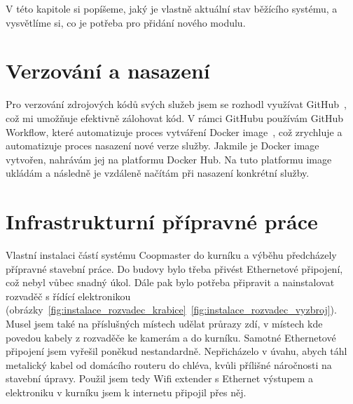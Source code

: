 V této kapitole si popíšeme, jaký je vlastně aktuální stav běžícího systému, a vysvětlíme si, co je potřeba pro přidání nového modulu.

\section*{Verzování a nasazení}

Pro verzování zdrojových kódů svých služeb jsem se rozhodl využívat GitHub~\cite{GitHubExplanation}, což mi umožňuje efektivně zálohovat kód.
V rámci GitHubu používám GitHub Workflow, které automatizuje proces vytváření Docker image~\cite{GitHubActionsDocker}, což zrychluje a automatizuje proces nasazení nové verze služby.
Jakmile je Docker image vytvořen, nahrávám jej na platformu Docker Hub\cite{DockerHub}.
Na tuto platformu image ukládám a následně je vzdáleně načítám při nasazení konkrétní služby.

\section*{Infrastrukturní přípravné práce}

Vlastní instalaci částí systému Coopmaster do kurníku a výběhu předcházely přípravné stavební práce.
Do budovy bylo třeba přivést Ethernetové připojení, což nebyl vůbec snadný úkol.
Dále pak bylo potřeba připravit a nainstalovat rozvaděč s řídící elektronikou
(obrázky~\ref{fig:instalace_rozvadec_krabice}~\ref{fig:instalace_rozvadec_vyzbroj}).
Musel jsem také na příslušných místech udělat průrazy zdí, v místech kde povedou kabely z rozvaděče ke kamerám a do kurníku.
Samotné Ethernetové připojení jsem vyřešil poněkud nestandardně.
Nepřicházelo v úvahu, abych táhl metalický kabel od domácího routeru do chléva, kvůli přílišné náročnosti na stavební úpravy.
Použil jsem tedy Wifi extender s Ethernet výstupem a elektroniku v kurníku jsem k internetu připojil přes něj.


